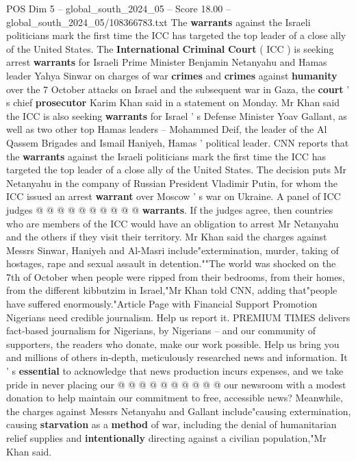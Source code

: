 \begin{textsample}{POS Dim 5 – global\_south\_2024\_05 – Score 18.00 – global\_south\_2024\_05/108366783.txt}  \label{ex:f5_pos_122}
The \textbf{warrants} against the Israeli politicians mark the first time the ICC has targeted the top leader of a close ally of the United States.
The \textbf{International} \textbf{Criminal} \textbf{Court} ( ICC ) is seeking arrest \textbf{warrants} for Israeli Prime Minister Benjamin Netanyahu and Hamas leader Yahya Sinwar on charges of war \textbf{crimes} and \textbf{crimes} against \textbf{humanity} over the 7 October attacks on Israel and the subsequent war in Gaza, the \textbf{court} ' s chief \textbf{prosecutor} Karim Khan said in a statement on Monday.
Mr Khan said the ICC is also seeking \textbf{warrants} for Israel ' s Defense Minister Yoav Gallant, as well as two other top Hamas leaders -- Mohammed Deif, the leader of the Al Qassem Brigades and Ismail Haniyeh, Hamas ' political leader.
CNN reports that the \textbf{warrants} against the Israeli politicians mark the first time the ICC has targeted the top leader of a close ally of the United States.
The decision puts Mr Netanyahu in the company of Russian President Vladimir Putin, for whom the ICC issued an arrest \textbf{warrant} over Moscow ' s war on Ukraine.
A panel of ICC judges @ @ @ @ @ @ @ @ @ @ \textbf{warrants}.
If the judges agree, then countries who are members of the ICC would have an obligation to arrest Mr Netanyahu and the others if they visit their territory.
Mr Khan said the charges against Messrs Sinwar, Haniyeh and Al-Masri include"extermination, murder, taking of hostages, rape and sexual assault in detention.""The world was shocked on the 7th of October when people were ripped from their bedrooms, from their homes, from the different kibbutzim in Israel,"Mr Khan told CNN, adding that"people have suffered enormously."Article Page with Financial Support Promotion Nigerians need credible journalism.
Help us report it.
PREMIUM TIMES delivers fact-based journalism for Nigerians, by Nigerians -- and our community of supporters, the readers who donate, make our work possible.
Help us bring you and millions of others in-depth, meticulously researched news and information.
It ' s \textbf{essential} to acknowledge that news production incurs expenses, and we take pride in never placing our @ @ @ @ @ @ @ @ @ @ our newsroom with a modest donation to help maintain our commitment to free, accessible news?
Meanwhile, the charges against Messrs Netanyahu and Gallant include"causing extermination, causing \textbf{starvation} as a \textbf{method} of war, including the denial of humanitarian relief supplies and \textbf{intentionally} directing against a civilian population,"Mr Khan said.

\end{textsample}
